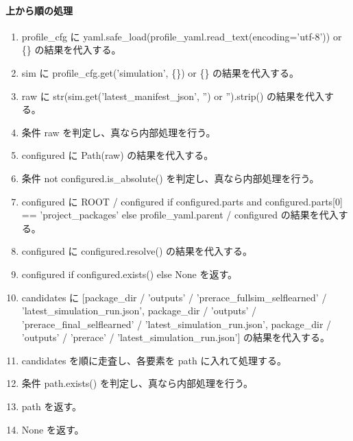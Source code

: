 \documentclass[a4paper,11pt]{article}
\begin{document}
            \paragraph{上から順の処理}
            \begin{enumerate}[leftmargin=1.8em]
            \item profile\_cfg に yaml.safe\_load(profile\_yaml.read\_text(encoding='utf-8')) or \{\} の結果を代入する。
\item sim に profile\_cfg.get('simulation', \{\}) or \{\} の結果を代入する。
\item raw に str(sim.get('latest\_manifest\_json', '') or '').strip() の結果を代入する。
\item 条件 raw を判定し、真なら内部処理を行う。
\item   configured に Path(raw) の結果を代入する。
\item   条件 not configured.is\_absolute() を判定し、真なら内部処理を行う。
\item     configured に ROOT / configured if configured.parts and configured.parts[0] == 'project\_packages' else profile\_yaml.parent / configured の結果を代入する。
\item   configured に configured.resolve() の結果を代入する。
\item   configured if configured.exists() else None を返す。
\item candidates に [package\_dir / 'outputs' / 'prerace\_fullsim\_selflearned' / 'latest\_simulation\_run.json', package\_dir / 'outputs' / 'prerace\_final\_selflearned' / 'latest\_simulation\_run.json', package\_dir / 'outputs' / 'prerace' / 'latest\_simulation\_run.json'] の結果を代入する。
\item candidates を順に走査し、各要素を path に入れて処理する。
\item   条件 path.exists() を判定し、真なら内部処理を行う。
\item     path を返す。
\item None を返す。
            \end{enumerate}
\end{document}
